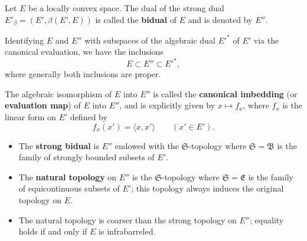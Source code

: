 Let $E$ be a locally convex space. The dual of the strong dual $E'_\beta = (E', \beta(E', E))$ is called the \textbf{bidual} of $E$ and is denoted by $E''$.

Identifying $E$ and $E''$ with subspaces of the algebraic dual $E'^*$ of $E'$ via the canonical evaluation, we have the inclusions
$$E \subset E'' \subset E'^*,$$
where generally both inclusions are proper.

The algebraic isomorphism of $E$ into $E''$ is called the \textbf{canonical imbedding} (or \textbf{evaluation map}) of $E$ into $E''$, and is explicitly given by $x \mapsto f_x$, where $f_x$ is the linear form on $E'$ defined by
$$f_x(x') = \langle x, x' \rangle \qquad (x' \in E').$$

\begin{itemize}
\item The \textbf{strong bidual} is $E''$ endowed with the $\mathfrak{S}$-topology where $\mathfrak{S} = \mathfrak{B}$ is the family of strongly bounded subsets of $E'$.
\item The \textbf{natural topology} on $E''$ is the $\mathfrak{S}$-topology where $\mathfrak{S} = \mathfrak{E}$ is the family of equicontinuous subsets of $E'$; this topology always induces the original topology on $E$.
\item The natural topology is coarser than the strong topology on $E''$; equality holds if and only if $E$ is infrabarreled.
\end{itemize}
